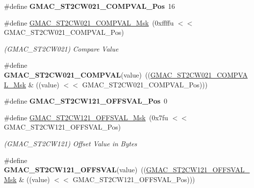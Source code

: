 \begin{DoxyCompactItemize}
\item 
\mbox{\label{group__SAMV71__GMAC_gaac90ef12fb8c60db6ffa953097f3cc4d}} 
\#define {\bfseries G\+M\+A\+C\+\_\+\+S\+T2\+C\+W021\+\_\+\+C\+O\+M\+P\+V\+A\+L\+\_\+\+Pos}~16
\item 
\mbox{\label{group__SAMV71__GMAC_ga0578add027e051a5682100c4af1c111e}} 
\#define \mbox{\hyperlink{group__SAMV71__GMAC_ga0578add027e051a5682100c4af1c111e}{G\+M\+A\+C\+\_\+\+S\+T2\+C\+W021\+\_\+\+C\+O\+M\+P\+V\+A\+L\+\_\+\+Msk}}~(0xffffu $<$$<$ G\+M\+A\+C\+\_\+\+S\+T2\+C\+W021\+\_\+\+C\+O\+M\+P\+V\+A\+L\+\_\+\+Pos)
\begin{DoxyCompactList}\small\item\em (G\+M\+A\+C\+\_\+\+S\+T2\+C\+W021) Compare Value \end{DoxyCompactList}\item 
\mbox{\label{group__SAMV71__GMAC_gabbd55e75b9b0dc9616e3b7c8148d6bac}} 
\#define {\bfseries G\+M\+A\+C\+\_\+\+S\+T2\+C\+W021\+\_\+\+C\+O\+M\+P\+V\+AL}(value)~((\mbox{\hyperlink{group__SAMV71__GMAC_ga0578add027e051a5682100c4af1c111e}{G\+M\+A\+C\+\_\+\+S\+T2\+C\+W021\+\_\+\+C\+O\+M\+P\+V\+A\+L\+\_\+\+Msk}} \& ((value) $<$$<$ G\+M\+A\+C\+\_\+\+S\+T2\+C\+W021\+\_\+\+C\+O\+M\+P\+V\+A\+L\+\_\+\+Pos)))
\item 
\mbox{\label{group__SAMV71__GMAC_ga9a3ea493e0fbaff8801e9671660c8839}} 
\#define {\bfseries G\+M\+A\+C\+\_\+\+S\+T2\+C\+W121\+\_\+\+O\+F\+F\+S\+V\+A\+L\+\_\+\+Pos}~0
\item 
\mbox{\label{group__SAMV71__GMAC_ga4b0c43166701b639b13c0328b73bbf34}} 
\#define \mbox{\hyperlink{group__SAMV71__GMAC_ga4b0c43166701b639b13c0328b73bbf34}{G\+M\+A\+C\+\_\+\+S\+T2\+C\+W121\+\_\+\+O\+F\+F\+S\+V\+A\+L\+\_\+\+Msk}}~(0x7fu $<$$<$ G\+M\+A\+C\+\_\+\+S\+T2\+C\+W121\+\_\+\+O\+F\+F\+S\+V\+A\+L\+\_\+\+Pos)
\begin{DoxyCompactList}\small\item\em (G\+M\+A\+C\+\_\+\+S\+T2\+C\+W121) Offset Value in Bytes \end{DoxyCompactList}\item 
\mbox{\label{group__SAMV71__GMAC_ga79cfaf80f43546a84dcd8949f65054c8}} 
\#define {\bfseries G\+M\+A\+C\+\_\+\+S\+T2\+C\+W121\+\_\+\+O\+F\+F\+S\+V\+AL}(value)~((\mbox{\hyperlink{group__SAMV71__GMAC_ga4b0c43166701b639b13c0328b73bbf34}{G\+M\+A\+C\+\_\+\+S\+T2\+C\+W121\+\_\+\+O\+F\+F\+S\+V\+A\+L\+\_\+\+Msk}} \& ((value) $<$$<$ G\+M\+A\+C\+\_\+\+S\+T2\+C\+W121\+\_\+\+O\+F\+F\+S\+V\+A\+L\+\_\+\+Pos)))

\end{DoxyCompactItemize}
